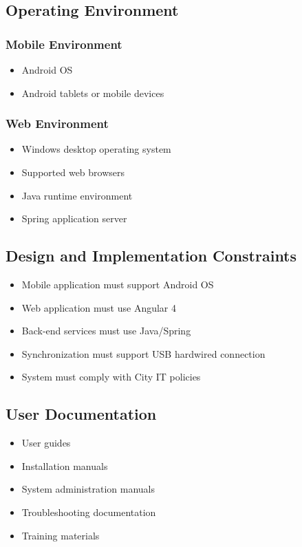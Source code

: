 \documentclass[12pt]{article}
\begin{document}
\subsection{Operating Environment}

\subsubsection*{Mobile Environment}

\begin{itemize}
\item Android OS
\item Android tablets or mobile devices
\end{itemize}

\subsubsection*{Web Environment}

\begin{itemize}
\item Windows desktop operating system
\item Supported web browsers
\item Java runtime environment
\item Spring application server
\end{itemize}

\subsection{Design and Implementation Constraints}

\begin{itemize}
\item Mobile application must support Android OS
\item Web application must use Angular 4
\item Back-end services must use Java/Spring
\item Synchronization must support USB hardwired connection
\item System must comply with City IT policies
\end{itemize}

\subsection{User Documentation}

\begin{itemize}
\item User guides
\item Installation manuals
\item System administration manuals
\item Troubleshooting documentation
\item Training materials
\end{itemize}
\end{document}
